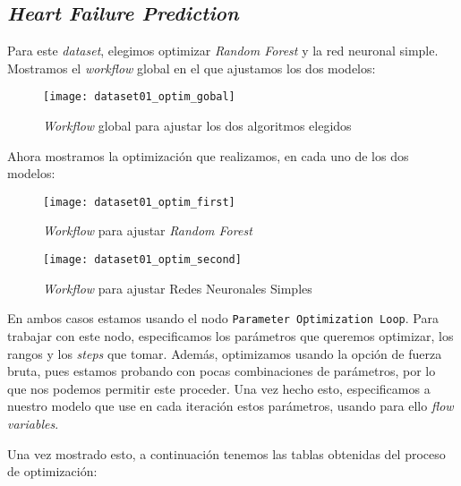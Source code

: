 \documentclass[11pt]{article}
\begin{document}
\pagebreak

\subsection{\emph{Heart Failure Prediction}} \label{optim_dataset01:seccion}

Para este \emph{dataset}, elegimos optimizar \emph{Random Forest} y la red neuronal simple. Mostramos el \emph{workflow} global en el que ajustamos los dos modelos:

\begin{figure}[H]
    \centering
    \texttt{[image: dataset01\_optim\_gobal]}
    \caption{\emph{Workflow} global para ajustar los dos algoritmos elegidos}
\end{figure}

Ahora mostramos la optimización que realizamos, en cada uno de los dos modelos:

\begin{figure}[H]
    \centering
    \texttt{[image: dataset01\_optim\_first]}
    \caption{\emph{Workflow} para ajustar \emph{Random Forest}}
\end{figure}

\begin{figure}[H]
    \centering
    \texttt{[image: dataset01\_optim\_second]}
    \caption{\emph{Workflow} para ajustar Redes Neuronales Simples}
\end{figure}

En ambos casos estamos usando el nodo \lstinline{Parameter Optimization Loop}. Para trabajar con este nodo, especificamos los parámetros que queremos optimizar, los rangos y los \emph{steps} que tomar. Además, optimizamos usando la opción de fuerza bruta, pues estamos probando con pocas combinaciones de parámetros, por lo que nos podemos permitir este proceder. Una vez hecho esto, especificamos a nuestro modelo que use en cada iteración estos parámetros, usando para ello \emph{flow variables}.

Una vez mostrado esto, a continuación tenemos las tablas obtenidas del proceso de optimización:
\end{document}
